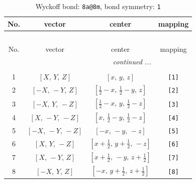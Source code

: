 \documentclass[fleqn,8pt]{jsarticle}
\begin{document}
\begin{longtable}{cccc}
\caption{Wyckoff bond: {\tt 8a@8m}, bond symmetry: {\tt 1}}
 \\
 \hline \hline
No. & vector & center & mapping \\ \hline \endfirsthead

\multicolumn{3}{l}{\tablename\ \thetable{}} \\
 \hline \hline
No. & vector & center & mapping \\ \hline \endhead

 \hline \hline
\multicolumn{3}{r}{\footnotesize\it continued ...} \\ \endfoot

 \hline \hline
\multicolumn{3}{r}{} \\ \endlastfoot

1 & $\left[ X,\, Y,\, Z \right]$ & $\left[ x,\, y,\, z \right]$ & {\tt [1]} \\ \hline
2 & $\left[ - X,\, - Y,\, Z \right]$ & $\left[ \frac{1}{2} - x,\, \frac{1}{2} - y,\, z \right]$ & {\tt [2]} \\ \hline
3 & $\left[ - X,\, Y,\, - Z \right]$ & $\left[ \frac{1}{2} - x,\, y,\, \frac{1}{2} - z \right]$ & {\tt [3]} \\ \hline
4 & $\left[ X,\, - Y,\, - Z \right]$ & $\left[ x,\, \frac{1}{2} - y,\, \frac{1}{2} - z \right]$ & {\tt [4]} \\ \hline
5 & $\left[ - X,\, - Y,\, - Z \right]$ & $\left[ - x,\, - y,\, - z \right]$ & {\tt [5]} \\ \hline
6 & $\left[ X,\, Y,\, - Z \right]$ & $\left[ x + \frac{1}{2},\, y + \frac{1}{2},\, - z \right]$ & {\tt [6]} \\ \hline
7 & $\left[ X,\, - Y,\, Z \right]$ & $\left[ x + \frac{1}{2},\, - y,\, z + \frac{1}{2} \right]$ & {\tt [7]} \\ \hline
8 & $\left[ - X,\, Y,\, Z \right]$ & $\left[ - x,\, y + \frac{1}{2},\, z + \frac{1}{2} \right]$ & {\tt [8]} \\
\end{longtable}
\end{document}
